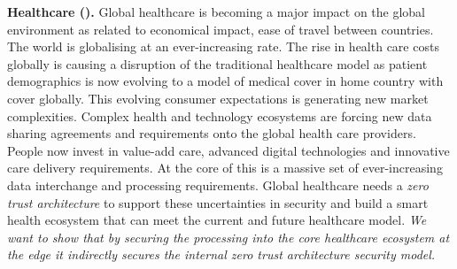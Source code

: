 \begin{Workpackage}{\thewpno}
\begin{Task}

\textbf{Healthcare (\SOPRAshort{}).} Global healthcare is becoming a major impact on the global environment as related to economical impact, ease of travel between countries. The world is globalising at an ever-increasing rate. The rise in health care costs globally is causing a disruption of the traditional healthcare model as patient demographics is now evolving to a model of medical cover in home country with cover globally. This evolving consumer expectations is generating new market complexities. Complex health and technology ecosystems are forcing new data sharing agreements and requirements onto the global health care providers. People now invest in value-add care, advanced digital technologies and innovative care delivery requirements. At the core of this is a massive set of ever-increasing data interchange and processing requirements. Global healthcare needs a \emph{zero trust architecture} to support these uncertainties in security and build a smart health ecosystem that can meet the current and future healthcare model. \emph{We want to show that by securing the processing into the core healthcare ecosystem at the edge it indirectly secures the internal zero trust architecture security model.}



\end{Task}
\end{Workpackage}
